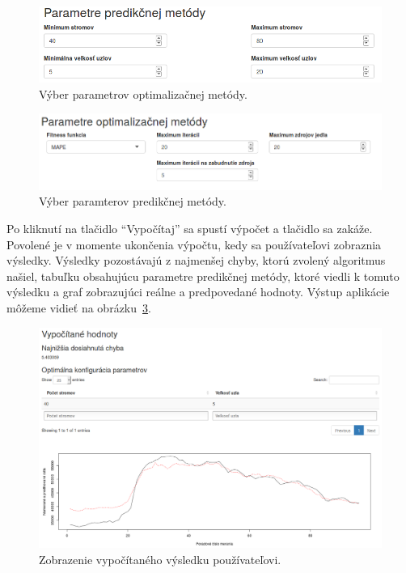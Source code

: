 \documentclass[a4paper,slovak,12pt,appendix]{article}
\begin{document}
\begin{figure}[H]
  \centering
  \includegraphics[width=\textwidth]{app_optimization.png}
  \caption{Výber parametrov optimalizačnej metódy.}
  \label{fig-app-optimization}
\end{figure}

\begin{figure}[H]
  \centering
  \includegraphics[width=\textwidth]{app_prediction.png}
  \caption{Výber paramterov predikčnej metódy.}
  \label{fig-app-prediction}
\end{figure}

Po kliknutí na tlačidlo ``Vypočítaj'' sa spustí výpočet a tlačidlo sa zakáže.
Povolené je v momente ukončenia výpočtu, kedy sa používateľovi zobraznia
výsledky. Výsledky pozostávajú z najmenšej chyby, ktorú zvolený algoritmus našiel,
tabuľku obsahujúcu parametre predikčnej metódy, ktoré viedli k tomuto výsledku
a graf zobrazujúci reálne a predpovedané hodnoty. Výstup aplikácie môžeme
vidieť na obrázku~\ref{fig-app-result}.

\begin{figure}[H]
  \centering
  \includegraphics[width=\textwidth]{app_result.png}
  \caption{Zobrazenie vypočítaného výsledku používateľovi.}
  \label{fig-app-result}
\end{figure}
\end{document}
